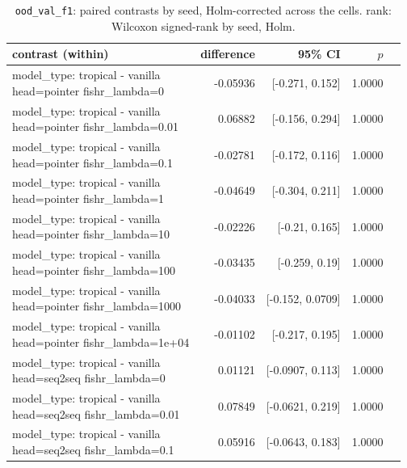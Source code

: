 \documentclass[10pt]{article}
\makeatletter
\newcommand{\stackcell}[1]{\begin{tabular}[t]{@{}l@{}}#1\end{tabular}}
\makeatother
\begin{document}
{\small
\begin{longtable}{lrrrl}
\caption{\texttt{ood\_val\_f1}: paired contrasts by seed, Holm-corrected across the cells. rank: Wilcoxon signed-rank by seed, Holm.}\label{tab:paired-ood_val_f1}\\
\toprule
contrast (within) & difference & 95\% CI & $p$ & \\
\midrule
\endhead
\stackcell{model\_type: tropical - vanilla\\\footnotesize head=pointer fishr\_lambda=0 } & -0.05936 & [-0.271, 0.152] & 1.0000 & \\
\stackcell{model\_type: tropical - vanilla\\\footnotesize head=pointer fishr\_lambda=0.01 } & 0.06882 & [-0.156, 0.294] & 1.0000 & \\
\stackcell{model\_type: tropical - vanilla\\\footnotesize head=pointer fishr\_lambda=0.1 } & -0.02781 & [-0.172, 0.116] & 1.0000 & \\
\stackcell{model\_type: tropical - vanilla\\\footnotesize head=pointer fishr\_lambda=1 } & -0.04649 & [-0.304, 0.211] & 1.0000 & \\
\stackcell{model\_type: tropical - vanilla\\\footnotesize head=pointer fishr\_lambda=10 } & -0.02226 & [-0.21, 0.165] & 1.0000 & \\
\stackcell{model\_type: tropical - vanilla\\\footnotesize head=pointer fishr\_lambda=100 } & -0.03435 & [-0.259, 0.19] & 1.0000 & \\
\stackcell{model\_type: tropical - vanilla\\\footnotesize head=pointer fishr\_lambda=1000 } & -0.04033 & [-0.152, 0.0709] & 1.0000 & \\
\stackcell{model\_type: tropical - vanilla\\\footnotesize head=pointer fishr\_lambda=1e+04 } & -0.01102 & [-0.217, 0.195] & 1.0000 & \\
\stackcell{model\_type: tropical - vanilla\\\footnotesize head=seq2seq fishr\_lambda=0 } & 0.01121 & [-0.0907, 0.113] & 1.0000 & \\
\stackcell{model\_type: tropical - vanilla\\\footnotesize head=seq2seq fishr\_lambda=0.01 } & 0.07849 & [-0.0621, 0.219] & 1.0000 & \\
\stackcell{model\_type: tropical - vanilla\\\footnotesize head=seq2seq fishr\_lambda=0.1 } & 0.05916 & [-0.0643, 0.183] & 1.0000 & \\

\end{longtable}}
\end{document}
